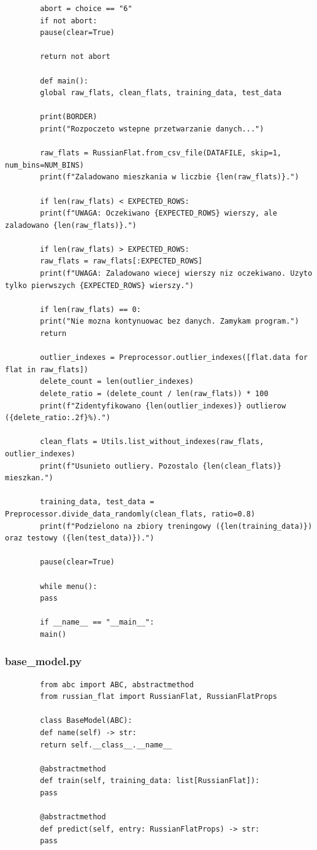 \documentclass[12pt,a4paper]{article}
\begin{document}
\begin{lstlisting}
		abort = choice == "6"
		if not abort:
		pause(clear=True)
		
		return not abort
		
		def main():
		global raw_flats, clean_flats, training_data, test_data
		
		print(BORDER)
		print("Rozpoczeto wstepne przetwarzanie danych...")
		
		raw_flats = RussianFlat.from_csv_file(DATAFILE, skip=1, num_bins=NUM_BINS)
		print(f"Zaladowano mieszkania w liczbie {len(raw_flats)}.")
		
		if len(raw_flats) < EXPECTED_ROWS:
		print(f"UWAGA: Oczekiwano {EXPECTED_ROWS} wierszy, ale zaladowano {len(raw_flats)}.")
		
		if len(raw_flats) > EXPECTED_ROWS:
		raw_flats = raw_flats[:EXPECTED_ROWS]
		print(f"UWAGA: Zaladowano wiecej wierszy niz oczekiwano. Uzyto tylko pierwszych {EXPECTED_ROWS} wierszy.")
		
		if len(raw_flats) == 0:
		print("Nie mozna kontynuowac bez danych. Zamykam program.")
		return
		
		outlier_indexes = Preprocessor.outlier_indexes([flat.data for flat in raw_flats])
		delete_count = len(outlier_indexes)
		delete_ratio = (delete_count / len(raw_flats)) * 100
		print(f"Zidentyfikowano {len(outlier_indexes)} outlierow ({delete_ratio:.2f}%).")
		
		clean_flats = Utils.list_without_indexes(raw_flats, outlier_indexes)
		print(f"Usunieto outliery. Pozostalo {len(clean_flats)} mieszkan.")
		
		training_data, test_data = Preprocessor.divide_data_randomly(clean_flats, ratio=0.8)
		print(f"Podzielono na zbiory treningowy ({len(training_data)}) oraz testowy ({len(test_data)}).")
		
		pause(clear=True)
		
		while menu():
		pass
		
		if __name__ == "__main__":
		main()
	\end{lstlisting}
	
	\subsubsection*{base\_model.py}
	\begin{lstlisting}
		from abc import ABC, abstractmethod
		from russian_flat import RussianFlat, RussianFlatProps
		
		class BaseModel(ABC):
		def name(self) -> str:
		return self.__class__.__name__
		
		@abstractmethod
		def train(self, training_data: list[RussianFlat]):
		pass
		
		@abstractmethod
		def predict(self, entry: RussianFlatProps) -> str:
		pass
	\end{lstlisting}
	
\end{document}
